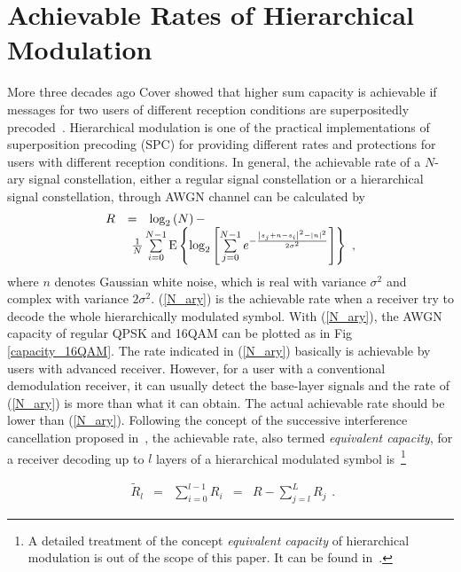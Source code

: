 \documentclass[10pt,fleqn, twocolumn]{IEEEtran}
\begin{document}
\section{Achievable Rates of Hierarchical Modulation~\label{Info_Theory}}
More three decades ago Cover showed that higher sum capacity is
achievable if messages for two users of different reception
conditions are superpositedly precoded~\cite{Cover72}.
Hierarchical modulation is one of the practical implementations of
superposition precoding (SPC) for providing different rates and
protections for users with different reception conditions. In
general, the achievable rate of a $N$-ary signal constellation,
either a regular signal constellation or a hierarchical signal
constellation, through AWGN channel can be calculated
by~\cite{Unge82}
\begin{equation}
\begin{array}{lcl}
R&=&\log_{2}\left(N\right)-\\
&&\hspace{-0.20in}\frac{1}{N}\sum\limits_{i=0}^{N-1}\mbox{E}\left\{\log_{2}\left[\sum\limits_{j=0}^{N-1}e^{-\frac{\left|s_{j}+n-s_{i}\right|^2-\left|n\right|^2}{2\sigma^2}}\right]\right\}\
,
\end{array}\label{N_ary}
\end{equation}
\noindent where $n$ denotes Gaussian white noise, which is real
with variance $\sigma^2$ and complex with variance $2\sigma^2$.
(\ref{N_ary}) is the achievable rate when a receiver try to decode
the whole hierarchically modulated symbol. With (\ref{N_ary}), the
AWGN capacity of regular QPSK and 16QAM can be plotted as in Fig
\ref{capacity_16QAM}. The rate indicated in (\ref{N_ary})
basically is achievable by users with advanced receiver. However,
for a user with a conventional demodulation receiver, it can
usually detect the base-layer signals and the rate of
(\ref{N_ary}) is more than what it can obtain. The actual
achievable rate should be lower than (\ref{N_ary}). Following the
concept of the successive interference cancellation proposed
in~\cite{Cover72}, the achievable rate, also termed {\em
equivalent capacity}, for a receiver decoding up to $l$ layers of
a hierarchical modulated symbol is~\footnote{A detailed treatment
of the concept {\em equivalent capacity} of hierarchical
modulation is out of the scope of this paper. It can be found
in~\cite{Huber94}. }

\begin{equation}
\begin{array}{rcccl}
\tilde{R}_{l}&=&\sum\limits_{i=0}^{l-1}R_{i}& = &
R-\sum\limits_{j=l}^{L}{R}_{j}
\end{array}.\label{R_equiv}
\end{equation}
\end{document}

